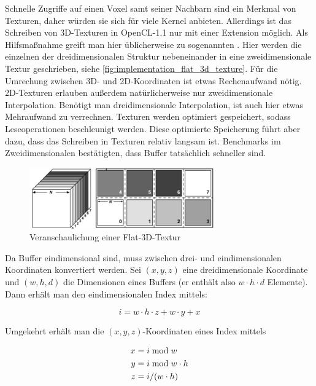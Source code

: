 Schnelle Zugriffe auf einen Voxel samt seiner Nachbarn sind ein Merkmal von
Texturen, daher würden sie sich für viele Kernel anbieten. Allerdings ist das
Schreiben von 3D-Texturen in OpenCL-1.1 nur mit einer Extension möglich. Als
Hilfsmaßnahme greift man hier üblicherweise zu sogenannten
 \cite{Harris2003}. Hier werden die einzelnen
 der dreidimensionalen Struktur nebeneinander in eine
zweidimensionale Textur geschrieben, siehe
\autoref{fig:implementation_flat_3d_texture}. Für die Umrechung zwischen 3D- und
2D-Koordinaten ist etwas Rechenaufwand nötig. 2D-Texturen erlauben außerdem
natürlicherweise nur zweidimensionale Interpolation. Benötigt man
dreidimensionale Interpolation, ist auch hier etwas Mehraufwand zu verrechnen.
Texturen werden optimiert gespeichert, sodass Leseoperationen beschleunigt
werden. Diese optimierte Speicherung führt aber dazu, dass das Schreiben in
Texturen relativ langsam ist. Benchmarks im Zweidimensionalen bestätigten, dass
Buffer tatsächlich schneller sind.

\begin{figure}[ht]
\centering
\includegraphics[width=8cm]{images/flat_3d_texture}
\caption{Veranschaulichung einer Flat-3D-Textur}
\label{fig:implementation_flat_3d_texture}
\end{figure}

Da Buffer eindimensional sind, muss zwischen drei- und eindimensionalen
Koordinaten konvertiert werden. Sei $(x,y,z)$ eine dreidimensionale Koordinate
und $(w,h,d)$ die Dimensionen eines Buffers (er enthält also $w \cdot h \cdot d$
Elemente). Dann erhält man den eindimensionalen Index mittels:

\begin{equation}
i = w \cdot h \cdot z + w \cdot y + x
\end{equation}

Umgekehrt erhält man die $(x,y,z)$-Koordinaten eines Index mittels

\begin{align*}
x &= i \bmod w \\
y &= i \bmod w \cdot h \\
z &= i / (w \cdot h)  \\
\end{align*}


